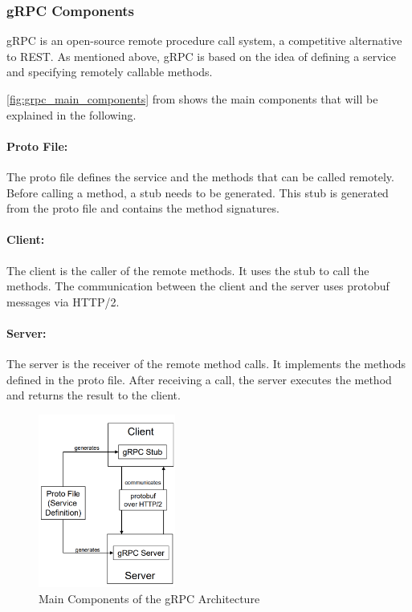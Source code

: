 \subsubsection*{gRPC Components}
gRPC is an open-source remote procedure call system, a competitive alternative to REST.
As mentioned above, gRPC is based on the idea of defining a service and specifying remotely callable methods.

\autoref{fig:grpc_main_components} from \cite{CM-T-DES} shows the main components that will be explained in the following.

\paragraph*{Proto File:}
The proto file defines the service and the methods that can be called remotely.
Before calling a method, a stub needs to be generated.
This stub is generated from the proto file and contains the method signatures.

\paragraph*{Client:}
The client is the caller of the remote methods.
It uses the stub to call the methods.
The communication between the client and the server uses protobuf messages via HTTP/2.

\paragraph*{Server:}
The server is the receiver of the remote method calls.
It implements the methods defined in the proto file.
After receiving a call, the server executes the method and returns the result to the client.

\begin{figure}
    \centering
    \includegraphics[width=0.4\textwidth]{figures/microservices/microservices_grpcMainComponents.png}
    \caption{Main Components of the gRPC Architecture}
    \label{fig:grpc_main_components}
\end{figure}

